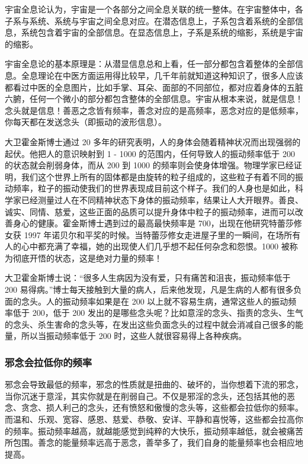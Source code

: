 \documentclass{ctexart}
\begin{document}
宇宙全息论认为，宇宙是一个各部分之间全息关联的统一整体。在宇宙整体中，各子系与系统、系统与宇宙之间全息对应。在潜态信息上，子系包含着系统的全部信息，系统包含着宇宙的全部信息。在显态信息上，子系是系统的缩影，系统是宇宙的缩影。

宇宙全息论的基本原理是：从潜显信息总和上看，任一部分都包含着整体的全部信息。全息理论在中医方面运用得比较早，几千年前就知道这种知识了，很多人应该都看过中医的全息图片，比如手掌、耳朵、面部的不同部位，都对应着身体的五脏六腑，任何一个微小的部分都包含整体的全部信息。宇宙从根本来说，就是信息！念头就是信息！善恶之念皆有频率，善念对应的是高频率，恶念对应的是低频率，你每天都在发送念头（即振动的波形信息）。

大卫霍金斯博士通过 20 多年的研究表明，人的身体会随着精神状况而出现强弱的起伏。他把人的意识映射到 1 - 1000 的范围内，任何导致人的振动频率低于 200 的状态就会削弱身体，而从 200 到 1000 的频率则会使身体增强。物理学家已经证明，我们这个世界上所有的固体都是由旋转的粒子组成的，这些粒子有着不同的振动频率，粒子的振动使我们的世界表现成目前这个样子。我们的人身也是如此，科学家已经测量过人在不同精神状态下身体的振动频率，结果让人大开眼界。善良、诚实、同情、慈爱，这些正面的品质可以提升身体中粒子的振动频率，进而可以改善身心的健康。霍金斯博士遇到过的最高最快频率是 700，出现在他研究特蕾莎修女获 1997 年诺贝尔和平奖的时候。当特蕾莎修女走进屋子里的一瞬间，在场所有人的心中都充满了幸福，她的出现使人们几乎想不起任何杂念和怨恨。1000 被称为彻底开悟的状态，这是绝对力量的频率！

大卫霍金斯博士说：“很多人生病因为没有爱，只有痛苦和沮丧，振动频率低于 200 易得病。”博士每天接触到大量的病人，后来他发现，凡是生病的人都有很多负面的念头。人的振动频率如果是在 200 以上就不容易生病，通常这些人的振动频率低于 200，低于 200 发出的是哪些念头呢？比如意淫的念头、指责的念头、生气的念头、杀生害命的念头等，在发出这些负面念头的过程中就会消减自己很多的能量，所以当振动频率低于 200 时，这些人就很容易得上各种疾病。

\subsubsection{邪念会拉低你的频率}

邪念会导致最低的频率，邪念的性质就是扭曲的、破坏的，当你想着下流的邪念，当你沉迷于意淫，其实你就是在削弱自己。不仅是邪淫的念头，还包括其他的恶念、贪念、损人利己的念头，还有愤怒和傲慢的念头等，这些都会拉低你的频率。而温和、乐观、宽容、感恩、慈爱、恭敬、安详、平静和喜悦等，这些都会拉高你的频率。振动频率越高，就越能感觉到纯粹的大快乐，振动频率越低，就会被痛苦所包围。善念的能量频率远高于恶念，善举多了，我们自身的能量频率也会相应地提高。
\end{document}
